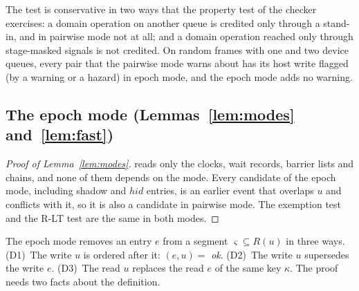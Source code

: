 The test is conservative in two ways that the property test of the checker exercises: a domain operation on another
queue is credited only through a stand-in, and in pairwise mode not at all; and a domain operation reached only
through stage-masked signals is not credited. On random frames with one and two device queues, every pair that the
pairwise mode warns about has its host write flagged (by a warning or a hazard) in epoch mode, and the epoch mode adds
no warning.

\subsection{The epoch mode (Lemmas~\ref{lem:modes} and~\ref{lem:fast})}
\label{app:fast}

\begin{proof}[Proof of Lemma~\ref{lem:modes}]
 reads only the clocks, wait records, barrier lists and chains, and none of them depends on the
mode. Every candidate of the epoch mode, including shadow and $\mathit{hid}$ entries, is an earlier event that
overlaps $u$ and conflicts with it, so it is also a candidate in pairwise mode. The exemption test and the R-LT
test are the same in both modes.
\end{proof}

The epoch mode removes an entry $e$ from a segment $\varsigma \subseteq R(u)$ in three ways. (D1)~The write $u$ is
ordered after it: $(e,u) = $ \emph{ok}. (D2)~The write $u$ supersedes the write $e$. (D3)~The read $u$
replaces the read $e$ of the same key $\kappa$. The proof needs two facts about the definition.

